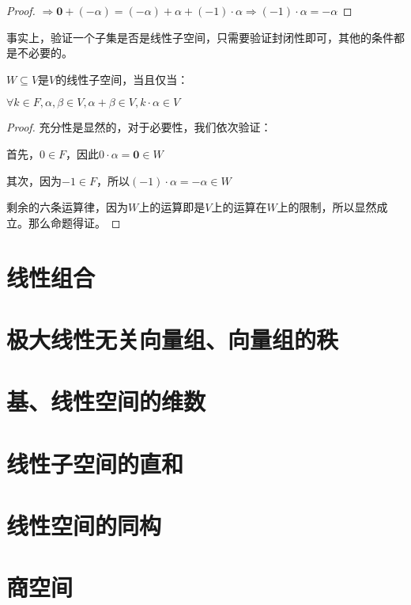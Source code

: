 \documentclass[12pt, a4paper, oneside, UTF8]{ctexbook}
\begin{document}
\begin{para}{0}
\begin{proof}
					$\Rightarrow \mathbf{0}+(-\alpha )=(-\alpha )+\alpha + (-1)\cdot \alpha \Rightarrow (-1)\cdot \alpha = -\alpha $
				\end{proof}
			\point{}
			事实上，验证一个子集是否是线性子空间，只需要验证封闭性即可，其他的条件都是不必要的。
				\begin{proposition}
					$W \subseteq V$是$V$的线性子空间，当且仅当：
	
					$\forall k \in F,\alpha ,\beta \in V,\alpha +\beta \in V,k\cdot \alpha \in V$
				\end{proposition}
				\begin{proof}
					充分性是显然的，对于必要性，我们依次验证：
	
					首先，$0 \in F$，因此$0\cdot \alpha =\mathbf{0}\in W$

					其次，因为$-1 \in F$，所以$(-1)\cdot \alpha = -\alpha \in W$

					剩余的六条运算律，因为$W$上的运算即是$V$上的运算在$W$上的限制，所以显然成立。那么命题得证。
				\end{proof}
		\end{para}
	\section{线性组合}
	\section{极大线性无关向量组、向量组的秩}
	\section{基、线性空间的维数}
	\section{线性子空间的直和}
	\section{线性空间的同构}
	\section{商空间}
\ifx\allfiles\undefined
\end{document}
